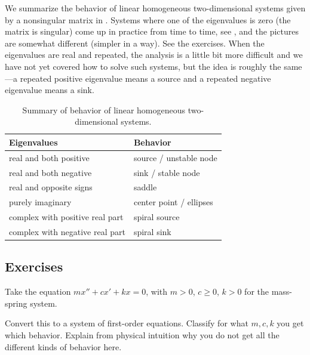 \medskip

We summarize the behavior of linear homogeneous two-dimensional systems
given by a nonsingular matrix
in .
Systems where one of the eigenvalues is zero (the matrix is singular)
come up in practice from time to time, see
, and the pictures are somewhat
different (simpler in a way).  See the exercises.
When the eigenvalues are real and repeated, the 
analysis is a little bit more difficult and we have not
yet covered how to solve such systems, but
the idea is roughly the same---a repeated positive
eigenvalue means a source and a repeated negative
eigenvalue means a sink.


\begin{table}[h!t]
\mybeginframe
\capstart
\begin{center}
\begin{tabular}{@{}ll@{}}
\toprule
Eigenvalues & Behavior \\
\midrule
real and both positive & source / unstable node \\
real and both negative & sink / stable node \\
real and opposite signs & saddle \\
purely imaginary & center point / ellipses \\
complex with positive real part & spiral source \\
complex with negative real part & spiral sink \\
\bottomrule
\end{tabular}
\end{center}
\caption{Summary of behavior of linear homogeneous two-dimensional systems.\label{pln:behtab}}
\myendframe
\end{table}

\subsection{Exercises}

\begin{exercise}
Take the equation $m x'' + c x' + kx = 0$, with $m > 0$, $c \geq 0$, $k > 0$
for the mass-spring system.
\begin{tasks}
\task Convert this to a system of first-order equations.
\task Classify for what $m, c, k$ you get which behavior.
\task Explain from physical intuition why you do not get all the
different kinds of behavior here.
\end{tasks}
\end{exercise}

